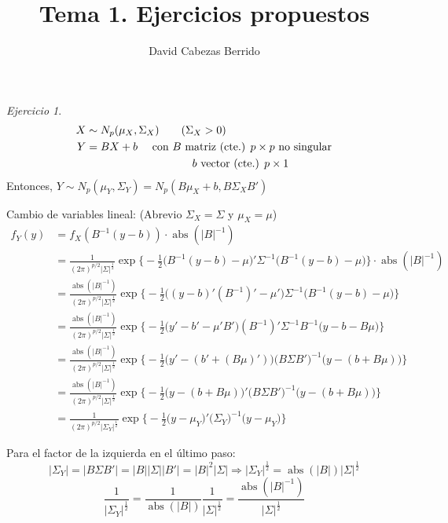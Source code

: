 \documentclass[12pt,spanish]{article}
\title{Tema 1. Ejercicios propuestos}
\author{David Cabezas Berrido}
\date{}
\theoremstyle{definition}
\theoremstyle{remark}
\newtheorem{exercise}{Ejercicio}
\begin{document}
\maketitle

\begin{exercise}
  \begin{align*}
    X&\sim N_p(\mu_X,\Sigma_X)\qquad (\Sigma_X>0) \\
    Y&=B X+b\quad \text{ con $B$ matriz (cte.) $p\times p$ no singular} \\
    &\hspace{34mm}\text{$b$ vector (cte.) $p\times 1$}
  \end{align*}
  Entonces, $Y\sim N_p(\mu_Y,\Sigma_Y)=N_p(B\mu_X+b,B\Sigma_X B')$

  Cambio de variables lineal: \qquad (Abrevio $\Sigma_X=\Sigma$ y
  $\mu_X=\mu$)
  \begin{align*}
    f_Y(y)&=f_X(B^{-1}(y-b))\cdot \operatorname{abs}(|B|^{-1}) \\ 
          &=\frac{1}{(2\pi)^{p/2}|\Sigma|^{\frac{1}{2}}}\exp\Big\{-\frac{1}{2}\big(B^{-1}(y-b)-\mu\big)'\Sigma^{-1}\big(B^{-1}(y-b)-\mu\big)\Big\}\cdot \operatorname{abs}(|B|^{-1}) \\
          &=\frac{\operatorname{abs}(|B|^{-1})}{(2\pi)^{p/2}|\Sigma|^{\frac{1}{2}}}\exp\Big\{-\frac{1}{2}\big((y-b)'(B^{-1})'-\mu'\big)\Sigma^{-1}\big(B^{-1}(y-b)-\mu\big)\Big\} \\
          &=\frac{\operatorname{abs}(|B|^{-1})}{(2\pi)^{p/2}|\Sigma|^{\frac{1}{2}}}\exp\Big\{-\frac{1}{2}\big(y'-b'-\mu'B'\big)(B^{-1})'\Sigma^{-1}B^{-1}\big(y-b-B\mu\big)\Big\} \\
          &=\frac{\operatorname{abs}(|B|^{-1})}{(2\pi)^{p/2}|\Sigma|^{\frac{1}{2}}}\exp\Big\{-\frac{1}{2}\big(y'-(b'+(B\mu)')\big)\big(B\Sigma B'\big)^{-1}\big(y-(b+B\mu)\big)\Big\} \\
          &=\frac{\operatorname{abs}(|B|^{-1})}{(2\pi)^{p/2}|\Sigma|^{\frac{1}{2}}}\exp\Big\{-\frac{1}{2}\big(y-(b+B\mu)\big)'\big(B\Sigma B'\big)^{-1}\big(y-(b+B\mu)\big)\Big\} \\
          &=\frac{1}{(2\pi)^{p/2}|\Sigma_Y|^{\frac{1}{2}}}\exp\Big\{-\frac{1}{2}\big(y-\mu_Y\big)'\big(\Sigma_Y\big)^{-1}\big(y-\mu_Y\big)\Big\}
  \end{align*}

  Para el factor de la izquierda en el último paso:
  \[|\Sigma_Y|=|B\Sigma
    B'|=|B||\Sigma||B'|=|B|^2|\Sigma|\Rightarrow|\Sigma_Y|^{\frac{1}{2}}=\operatorname{abs}(|B|)|\Sigma|^{\frac{1}{2}}\]
  \[\frac{1}{|\Sigma_Y|^{\frac{1}{2}}}=\frac{1}{\operatorname{abs}(|B|)}\frac{1}{|\Sigma|^{\frac{1}{2}}}=\frac{\operatorname{abs}(|B|^{-1})}{|\Sigma|^{\frac{1}{2}}}\]
\end{exercise}
\end{document}
